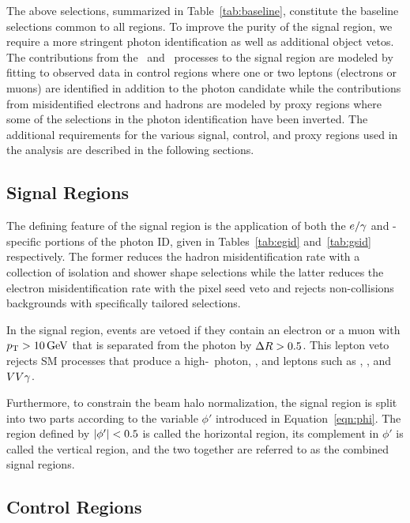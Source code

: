 The above selections, summarized in Table~\ref{tab:baseline}, constitute the baseline selections common to all regions.
To improve the purity of the signal region, we require a more stringent photon identification as well as additional object vetos.
The contributions from the \zinvg\ and \wlng\ processes to the signal region are modeled by fitting to observed data in control regions where one or two leptons (electrons or muons) are identified in addition to the photon candidate while the contributions from misidentified electrons and hadrons are modeled by proxy regions where some of the selections in the photon identification have been inverted.
The additional requirements for the various signal, control, and proxy regions used in the analysis are described in the following sections.

\subsection{Signal Regions}
\label{sec:signal_regions}

The defining feature of the signal region is the application of both the ${e}/\gamma$ and \Pgg-specific portions of the photon ID, given in Tables~\ref{tab:egid} and~\ref{tab:gsid} respectively.
The former reduces the hadron misidentification rate with a collection of isolation and shower shape selections while the latter reduces the electron misidentification rate with the pixel seed veto and rejects non-collisions backgrounds with specifically tailored selections.

In the signal region, events are vetoed if they contain an electron or a muon with $p_{\mathrm{T}} > 10\,\text{Ge\hspace{-.08em}V}$ that is separated from the photon by $\Delta R > 0.5$. This lepton veto rejects SM processes that produce a high-\pt\ photon, \met, and leptons such as \wlng, \ttg, and $VV\gamma$. %

Furthermore, to constrain the beam halo normalization, the signal region is split into two parts according to the variable $\phi'$ introduced in Equation~\ref{eqn:phi}. 
The region defined by $\lvert \phi' \rvert < 0.5$ is called the horizontal region, its complement in $\phi'$ is called the vertical region, and the two together are referred to as the combined signal regions.

\subsection{Control Regions}
\label{sec:control_regions}

